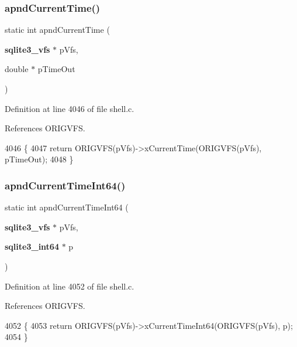 \subsubsection{apnd\+Current\+Time()}
{\footnotesize\ttfamily static int apnd\+Current\+Time (\begin{DoxyParamCaption}\item[{\textbf{ sqlite3\+\_\+vfs} $\ast$}]{p\+Vfs,  }\item[{double $\ast$}]{p\+Time\+Out }\end{DoxyParamCaption})\hspace{0.3cm}{\ttfamily [static]}}



Definition at line 4046 of file shell.\+c.



References O\+R\+I\+G\+V\+FS.


\begin{DoxyCode}
4046                                                                \{
4047   \textcolor{keywordflow}{return} ORIGVFS(pVfs)->xCurrentTime(ORIGVFS(pVfs), pTimeOut);
4048 \}
\end{DoxyCode}
\mbox{\label{shell_8c_a28e524db8ef0085740afe68b120dd8d9}} 
\subsubsection{apnd\+Current\+Time\+Int64()}
{\footnotesize\ttfamily static int apnd\+Current\+Time\+Int64 (\begin{DoxyParamCaption}\item[{\textbf{ sqlite3\+\_\+vfs} $\ast$}]{p\+Vfs,  }\item[{\textbf{ sqlite3\+\_\+int64} $\ast$}]{p }\end{DoxyParamCaption})\hspace{0.3cm}{\ttfamily [static]}}



Definition at line 4052 of file shell.\+c.



References O\+R\+I\+G\+V\+FS.


\begin{DoxyCode}
4052                                                                     \{
4053   \textcolor{keywordflow}{return} ORIGVFS(pVfs)->xCurrentTimeInt64(ORIGVFS(pVfs), p);
4054 \}
\end{DoxyCode}
\mbox{\label{shell_8c_a368491730255f236e59b40e2bdddf20f}} 
